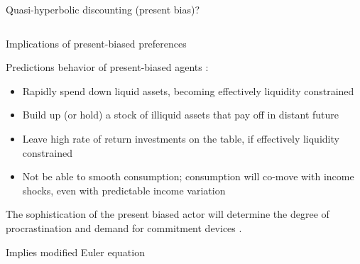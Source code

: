 \documentclass[aspectratio=169, 10pt, handout]{beamer}
\newenvironment{wideitemize}{\itemize\addtolength{\itemsep}{10pt}}{\enditemize}
\begin{document}
\begin{frame}{Quasi-hyperbolic discounting (present bias)?}
\begin{columns}[T]
\end{columns}

\end{frame}



\begin{frame}{Implications of present-biased preferences}

\begin{wideitemize}
	
	\item Predictions behavior of present-biased agents \citep{angeletos2001hyperbolic}:
	
	\begin{itemize}

		\item Rapidly spend down liquid assets, becoming effectively liquidity constrained
	
		\item Build up (or hold) a stock of illiquid assets that pay off in distant future
	
		\item Leave high rate of return investments on the table, if effectively liquidity constrained

		\item Not be able to smooth consumption; consumption will co-move with income shocks, even with predictable income variation

	\end{itemize}

	\item The sophistication of the present biased actor will determine the degree of procrastination and demand for commitment devices \citep{o1999doing,ODonoghue2001}.
	
	\item Implies modified Euler equation \citep{harris2001dynamic}
	
\end{wideitemize}

\end{frame}
\end{document}
